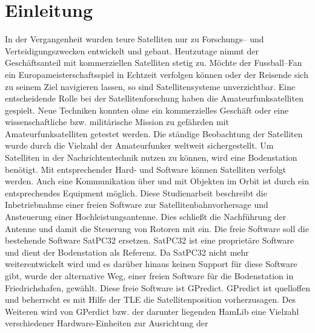 
\chapter{Einleitung}
In der Vergangenheit wurden teure Satelliten nur zu Forschungs-- und Verteidigungszwecken entwickelt und gebaut. Heutzutage nimmt der 
Geschäftsanteil mit kommerziellen Satelliten stetig zu. Möchte der Fussball--Fan ein Europameisterschaftsspiel in Echtzeit verfolgen können oder der 
Reisende sich zu seinem Ziel navigieren lassen, so sind Satellitensysteme unverzichtbar.
\newpar
Eine entscheidende Rolle bei der Satellitenforschung haben die 
Amateurfunksatelliten 
gespielt. Neue Techniken konnten ohne ein kommerzielles Geschäft oder eine wissenschaftliche bzw. militärische Mission zu gefährden mit 
Amateurfunksatelliten getestet werden. Die ständige Beobachtung der Satelliten wurde durch die 
Vielzahl der Amateurfunker weltweit sichergestellt. 
\newpar
Um Satelliten in der Nachrichtentechnik nutzen zu können, wird eine Bodenstation benötigt. Mit entsprechender Hard- und 
Software können Satelliten verfolgt werden. Auch eine Kommunikation über und mit Objekten im Orbit ist durch ein entsprechendes Equipment möglich. 
\newpar
Diese Studienarbeit beschreibt die Inbetriebnahme einer freien Software 
zur Satellitenbahnvorhersage und Ansteuerung einer Hochleistungsantenne. Dies schließt die Nachführung der Antenne und damit die Steuerung von 
Rotoren mit ein. Die freie Software soll die bestehende Software 
SatPC32 ersetzen. SatPC32 ist eine proprietäre Software und dient der Bodenstation als Referenz. Da SatPC32 nicht mehr weiterentwickelt wird 
und es darüber hinaus keinen Support für diese Software gibt, wurde der alternative Weg, einer freien Software für die Bodenstation in 
Friedrichshafen, gewählt. Diese freie Software ist GPredict. GPredict ist quelloffen und beherrscht es mit Hilfe der \ac{TLE} die Satellitenposition 
vorherzusagen. Des Weiteren wird von GPerdict bzw. der darunter liegenden HamLib eine Vielzahl verschiedener Hardware-Einheiten zur Ausrichtung der 
